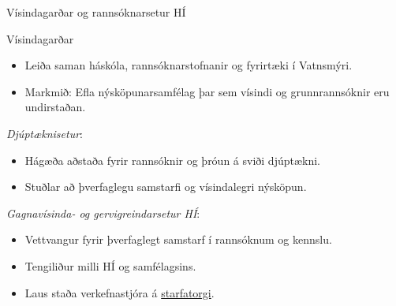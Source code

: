 \documentclass[
    NAME={Dr. Helga Ingimundardóttir},
    EMAIL={helgaingim@hi.is},
    FACULTY={Iðnaðarverkfræðideild},
    TITLE={Spáum fyrir um framtíð gervigreindar},
    SUBTITLE={út frá akademísku sjónarmiði},
    SEMINAR={Stjórnvísi},
    DATE={22. febrúar 2025},
    WIDE=true,
    ICELANDIC=true
]{HI-LaTeX/hi-beamer}
\begin{document}
\begin{frame}{Vísindagarðar og rannsóknarsetur HÍ}
    \begin{block}{Vísindagarðar}
        \begin{itemize}
            \item Leiða saman háskóla, rannsóknarstofnanir og fyrirtæki í Vatnsmýri.
            \item Markmið: Efla nýsköpunarsamfélag þar sem vísindi og grunnrannsóknir eru undirstaðan.
        \end{itemize}
    \end{block}
    \emph{Djúptæknisetur}:
        \begin{itemize}
            \item Hágæða aðstaða fyrir rannsóknir og þróun á sviði djúptækni.
            \item Stuðlar að þverfaglegu samstarfi og vísindalegri nýsköpun.
        \end{itemize}
    \emph{Gagnavísinda- og gervigreindarsetur HÍ}:
        \begin{itemize}
            \item Vettvangur fyrir þverfaglegt samstarf í rannsóknum og kennslu.
            \item Tengiliður milli HÍ og samfélagsins.
            \item Laus staða verkefnastjóra á \href{https://island.is/starfatorg/x-40180}{starfatorgi}.
        \end{itemize}
\end{frame}
\end{document}
